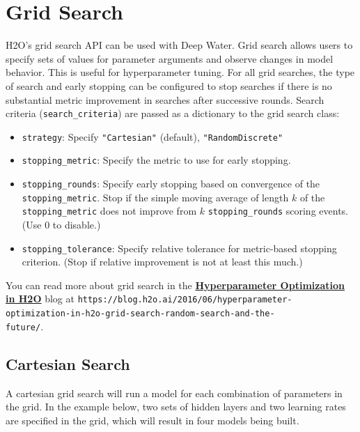 \section{Grid Search}
	H2O's grid search API can be used with Deep Water.  Grid search allows users to specify sets of values for parameter arguments and observe changes in model behavior.  This is useful for hyperparameter tuning.  For all grid searches, the type of search and early stopping can be configured to stop searches if there is no substantial metric improvement in searches after successive rounds.  Search criteria (\texttt{search\_criteria}) are passed as a dictionary to the grid search class:
	\begin{itemize}
		\item{\texttt{strategy}}: Specify \texttt{"Cartesian"} (default), \texttt{"RandomDiscrete"}
		\item{\texttt{stopping\_metric}}: Specify the metric to use for early stopping.
		\item{\texttt{stopping\_rounds}}: Specify early stopping based on convergence of the \texttt{stopping\_metric}.  Stop if the simple moving average of length $k$ of the \texttt{stopping\_metric} does not improve from $k$ \texttt{stopping\_rounds} scoring events. (Use 0 to disable.)
		\item{\texttt{stopping\_tolerance}}: Specify relative tolerance for metric-based stopping criterion. (Stop if relative improvement is not at least this much.)
	\end{itemize}
	
	You can read more about grid search in the \textbf{\href{https://blog.h2o.ai/2016/06/hyperparameter-optimization-in-h2o-grid-search-random-search-and-the-future/}{Hyperparameter Optimization in H2O}} blog at \texttt{https://blog.h2o.ai/2016/06/hyperparameter-} \texttt{optimization-in-h2o-grid-search-random-search-and-the-} \\ \texttt{future/}.
	
	\newpage
	\subsection{Cartesian Search}
		A cartesian grid search will run a model for each combination of parameters in the grid.  In the example below, two sets of hidden layers and two learning rates are specified in the grid, which will result in four models being built.
		
\waterExampleInPython


